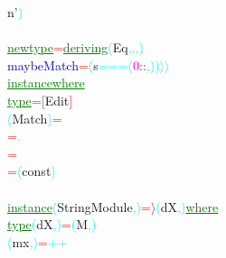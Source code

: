 {\rm{}n'}\textcolor{cyan}{)}\\\\\textcolor{green}{\underline{newtype}}\hsspace \textcolor{red}{=}\hsspace \textcolor{green}{\underline{deriving}}\hsspace \textcolor{cyan}{(}{\rm{}Eq}\textcolor{cyan}{,}\textcolor{cyan}{,}\textcolor{cyan}{,}\textcolor{cyan}{)}\\\textcolor{blue}{maybeMatch}\hsspace \textcolor{red}{=}\hsspace \textcolor{cyan}{(}{\rm{}s}\hsspace \textcolor{cyan}{=\tilde{ }}\hsspace \textcolor{cyan}{==}\hsspace \textcolor{cyan}{(}\textcolor{magenta}{0}\hsspace \textcolor{red}{::}\textcolor{cyan}{,}\textcolor{cyan}{)}\textcolor{cyan}{)}\hsspace \textcolor{cyan}{\ensuremath{\rangle}\ensuremath{\rangle}}\\\textcolor{green}{\underline{instance}}\hsspace \textcolor{green}{\underline{where}}\\\hstab \textcolor{green}{\underline{type}}\hsspace \textcolor{red}{=}\hsspace \textcolor{red}{[}{\rm{}Edit}\textcolor{red}{]}\\\hsspace \textcolor{cyan}{(}{\rm{}Match}\textcolor{cyan}{)}\hsspace \textcolor{red}{=}\\\hsspace \hsspace \textcolor{red}{=}\hsspace \textcolor{cyan}{.}\\\hsspace \textcolor{red}{=}\\\hsspace \hsspace \hsspace \textcolor{red}{=}\hsspace \textcolor{cyan}{(}{\rm{}const}\textcolor{cyan}{)}\\\\\textcolor{green}{\underline{instance}}\hsspace \textcolor{cyan}{(}{\rm{}StringModule}\textcolor{cyan}{,}\textcolor{cyan}{)}\hsspace \textcolor{red}{=\ensuremath{\rangle}}\hsspace \textcolor{cyan}{(}{\rm{}dX}\textcolor{cyan}{,}\textcolor{cyan}{)}\hsspace \textcolor{green}{\underline{where}}\\\hstab \textcolor{green}{\underline{type}}\hsspace \textcolor{cyan}{(}{\rm{}dX}\textcolor{cyan}{,}\textcolor{cyan}{)}\hsspace \textcolor{red}{=}\hsspace \textcolor{cyan}{(}{\rm{}M}\textcolor{cyan}{,}\textcolor{cyan}{)}\\\hsspace \textcolor{cyan}{(}{\rm{}mx}\textcolor{cyan}{,}\textcolor{cyan}{)}\hsspace \textcolor{red}{=}\hsspace \textcolor{cyan}{++}\\\hsspace 